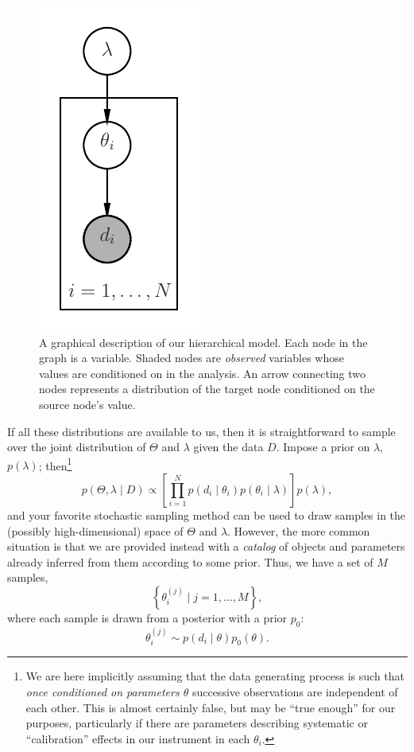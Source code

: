 \documentclass[modern]{aastex63}
\begin{document}
\begin{figure}
  \begin{center}
  \includegraphics[height=0.5\columnwidth]{pgm}
\end{center}
%
  \caption{\label{fig:pgm} A graphical description of our hierarchical model.
  Each node in the graph is a variable.  Shaded nodes are \emph{observed}
  variables whose values are conditioned on in the analysis.  An arrow
  connecting two nodes represents a distribution of the target node conditioned
  on the source node's value.}
%
\end{figure}

If all these distributions are available to us, then it is straightforward to
sample over the joint distribution of $\Theta$ and $\lambda$ given the data $D$.
Impose a prior on $\lambda$, $p\left( \lambda \right)$; then\footnote{We are
here implicitly assuming that the data generating process is such that
\emph{once conditioned on parameters $\theta$} successive observations are
independent of each other.  This is almost certainly false, but may be ``true
enough'' for our purposes, particularly if there are parameters describing
systematic or ``calibration'' effects in our instrument in each $\theta_i$.}
%
\begin{equation}
  \label{eq:joint-posterior}
  p\left( \Theta, \lambda \mid D \right) \propto \left[ \prod_{i=1}^N p\left( d_i \mid \theta_i \right) p\left( \theta_i \mid \lambda \right) \right] p\left( \lambda \right),
\end{equation}
%
and your favorite stochastic sampling method\texttrademark{} can be used to draw
samples in the (possibly high-dimensional) space of $\Theta$ and $\lambda$.
However, the more common situation is that we are provided instead with a
\emph{catalog} of objects and parameters already inferred from them according
to some prior.  Thus, we have a set of $M$ samples,
%
\begin{equation}
  \left\{ \theta_i^{(j)} \mid j = 1, \ldots, M \right\},
\end{equation}
%
where each sample is drawn from a posterior with a prior $p_0$:
%
\begin{equation}
  \theta_i^{(j)} \sim p\left( d_i \mid \theta \right) p_0\left(\theta \right).
\end{equation}
\end{document}
